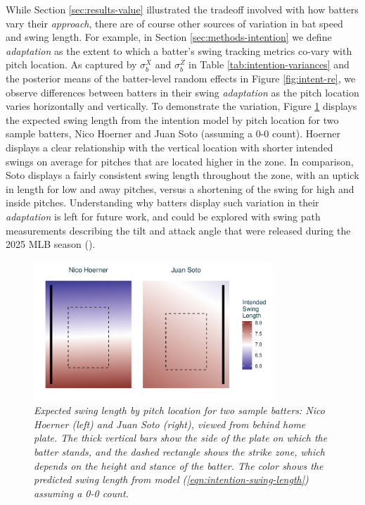 \documentclass{article}
\begin{document}
    While Section \ref{sec:results-value} illustrated the tradeoff involved with how batters vary their \textit{approach}, there are of course other sources of variation in bat speed and swing length. For example, in Section \ref{sec:methods-intention} we define \textit{adaptation} as the extent to which a batter's swing tracking metrics co-vary with pitch location. As captured by $\sigma_b^X$ and $\sigma_b^Z$ in Table \ref{tab:intention-variances} and the posterior means of the batter-level random effects in Figure \ref{fig:intent-re}, we observe differences between batters in their swing \textit{adaptation} as the pitch location varies horizontally and vertically. To demonstrate the variation, Figure \ref{fig:adaptation} displays the expected swing length from the intention model by pitch location for two sample batters, Nico Hoerner and Juan Soto (assuming a 0-0 count). Hoerner displays a clear relationship with the vertical location with shorter intended swings on average for pitches that are located higher in the zone. In comparison, Soto displays a fairly consistent swing length throughout the zone, with an uptick in length for low and away pitches, versus a shortening of the swing for high and inside pitches. Understanding why batters display such variation in their \textit{adaptation} is left for future work, and could be explored with swing path measurements describing the tilt and attack angle that were released during the 2025 MLB season (\cite{petriello_4_2025}).
    
      \begin{figure}
        \centering
        \includegraphics[width = 0.8\textwidth]{../../figures/adaptation.pdf}
        \caption{\it Expected swing length by pitch location for two sample batters: Nico Hoerner (left) and Juan Soto (right), viewed from behind home plate. The thick vertical bars show the side of the plate on which the batter stands, and the dashed rectangle shows the strike zone, which depends on the height and stance of the batter. The color shows the predicted swing length  from model (\ref{eqn:intention-swing-length}) assuming a 0-0 count.}
        \label{fig:adaptation}
      \end{figure}
\end{document}
